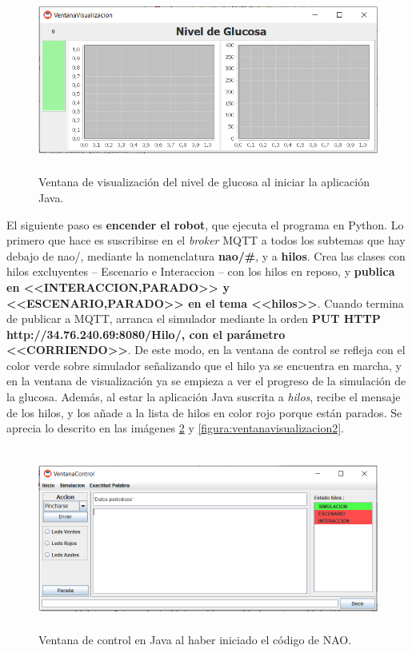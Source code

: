 \documentclass[12pt,spanish,listoffigures,listoftables]{tfgetsinf}
\begin{document}
\begin{figure}[!h]
	\centering
	\includegraphics[height=6cm]{img/ventanavisualizacion1}
	\caption{Ventana de visualización del nivel de glucosa al iniciar la aplicación Java.}
	\label{figura:ventanavisualizacion1}
\end{figure}

El siguiente paso es \textbf{encender el robot}, que ejecuta el programa en Python. Lo primero que hace es suscribirse en el \textit{broker} MQTT a todos los subtemas que hay debajo de nao/, mediante la nomenclatura \textbf{nao/\#}, y a \textbf{hilos}. Crea las clases con hilos excluyentes -- Escenario e Interaccion -- con los hilos en reposo, y  \textbf{publica en <<INTERACCION,PARADO>> y <<ESCENARIO,PARADO>> en el tema <<hilos>>}. Cuando termina de publicar a MQTT, arranca el simulador mediante la orden \textbf{PUT HTTP http://34.76.240.69:8080/Hilo/, con el parámetro <<CORRIENDO>>}. De este modo, en la ventana de control se refleja con el color verde sobre simulador señalizando que el hilo ya se encuentra en marcha, y en la ventana de visualización ya se empieza a ver el progreso de la simulación de la glucosa. Además, al estar la aplicación Java suscrita a \textit{hilos}, recibe el mensaje de los hilos, y los añade a la lista de hilos en color rojo porque están parados. Se aprecia lo descrito en las imágenes \ref{figura:ventanacontrol2} y \ref{figura:ventanavisualizacion2}.

\begin{figure}[!h]
	\centering
	\includegraphics[height=6cm]{img/ventanacontrol2}
	\caption{Ventana de control en Java al haber iniciado el código de NAO.}
	\label{figura:ventanacontrol2}
\end{figure}
\end{document}
